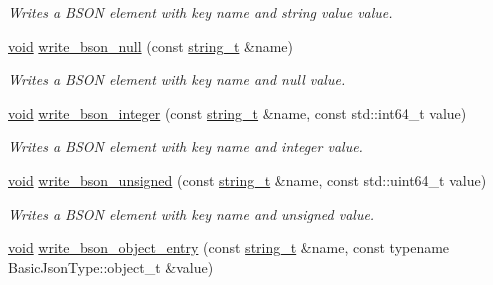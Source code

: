 \begin{DoxyCompactItemize}
\begin{DoxyCompactList}\small\item\em Writes a B\+S\+ON element with key {\itshape name} and string value {\itshape value}. \end{DoxyCompactList}\item 
\mbox{\hyperlink{namespacenlohmann_1_1detail_a59fca69799f6b9e366710cb9043aa77d}{void}} \mbox{\hyperlink{classnlohmann_1_1detail_1_1binary__writer_a9927c1110b18661e0224a76156e5a7a9}{write\+\_\+bson\+\_\+null}} (const \mbox{\hyperlink{classnlohmann_1_1detail_1_1binary__writer_a29f2ae7a5c4a8c1dae47b3b2310de8a8}{string\+\_\+t}} \&name)
\begin{DoxyCompactList}\small\item\em Writes a B\+S\+ON element with key {\itshape name} and null value. \end{DoxyCompactList}\item 
\mbox{\hyperlink{namespacenlohmann_1_1detail_a59fca69799f6b9e366710cb9043aa77d}{void}} \mbox{\hyperlink{classnlohmann_1_1detail_1_1binary__writer_a553ad4dbdf27238eef90867e4bf2f3e5}{write\+\_\+bson\+\_\+integer}} (const \mbox{\hyperlink{classnlohmann_1_1detail_1_1binary__writer_a29f2ae7a5c4a8c1dae47b3b2310de8a8}{string\+\_\+t}} \&name, const std\+::int64\+\_\+t value)
\begin{DoxyCompactList}\small\item\em Writes a B\+S\+ON element with key {\itshape name} and integer {\itshape value}. \end{DoxyCompactList}\item 
\mbox{\hyperlink{namespacenlohmann_1_1detail_a59fca69799f6b9e366710cb9043aa77d}{void}} \mbox{\hyperlink{classnlohmann_1_1detail_1_1binary__writer_a5e295ed1be6af6260d2a65f7397c3742}{write\+\_\+bson\+\_\+unsigned}} (const \mbox{\hyperlink{classnlohmann_1_1detail_1_1binary__writer_a29f2ae7a5c4a8c1dae47b3b2310de8a8}{string\+\_\+t}} \&name, const std\+::uint64\+\_\+t value)
\begin{DoxyCompactList}\small\item\em Writes a B\+S\+ON element with key {\itshape name} and unsigned {\itshape value}. \end{DoxyCompactList}\item 
\mbox{\hyperlink{namespacenlohmann_1_1detail_a59fca69799f6b9e366710cb9043aa77d}{void}} \mbox{\hyperlink{classnlohmann_1_1detail_1_1binary__writer_a6231302930265eccb3f56c378f7b0661}{write\+\_\+bson\+\_\+object\+\_\+entry}} (const \mbox{\hyperlink{classnlohmann_1_1detail_1_1binary__writer_a29f2ae7a5c4a8c1dae47b3b2310de8a8}{string\+\_\+t}} \&name, const typename Basic\+Json\+Type\+::object\+\_\+t \&value)

\end{DoxyCompactItemize}
